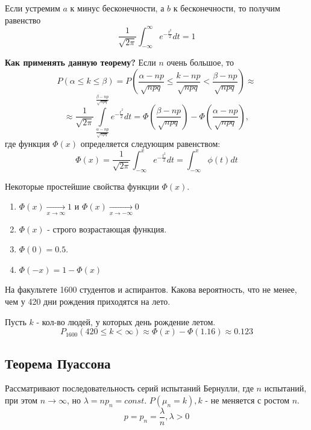 \begin{corollary}
	Если устремим $a$ к минус бесконечности, а $b$ к бесконечности, то получим равенство
	\[ \frac{1}{\sqrt{2 \pi}} \int_{-\infty}^{\infty} e^{-\frac{t^2}{2}} dt = 1 \]
\end{corollary}

\noindent \textbf{Как применять данную теорему?} Если $n$ очень большое, то
\[ P(\alpha \le k \le \beta) = P \left( \frac{\alpha - np}{\sqrt{npq}} \le \frac{k - np}{\sqrt{npq}} < \frac{\beta - np}{\sqrt{npq}} \right) \approx \]
\[ \approx \frac{1}{\sqrt{2 \pi}} \int\limits_{\frac{\alpha - np}{\sqrt{npq}}}^{\frac{\beta - np}{\sqrt{npq}}} e^{-\frac{t^2}{2}} dt = \Phi \left( \frac{\beta - np}{\sqrt{npq}} \right) - \Phi \left( \frac{\alpha - np}{\sqrt{npq}} \right), \]
где функция $\Phi (x)$ определяется следующим равенством:
\[ \Phi (x) = \frac{1}{\sqrt{2 \pi}} \int_{-\infty}^{x} e^{-\frac{t^2}{2}} dt = \int_{-\infty}^{x} \phi (t) dt \]

Некоторые простейшие свойства функции $\Phi (x)$.
\begin{enumerate}
	\item $\Phi (x) \underset{x \to \infty}{\to} 1$ и $\Phi (x) \underset{x \to - \infty}{\to} 0$
	\item $\Phi (x)$ - строго возрастающая функция.
	\item $\Phi (0) = 0.5$.
	\item $\Phi (-x) = 1 - \Phi (x)$
\end{enumerate}

\begin{exmp}
	На факультете 1600 студентов и аспирантов. Какова вероятность, что не менее, чем у 420 дни рождения приходятся на лето.
	
	Пусть $k$ - кол-во людей, у которых день рождение летом.
	\[ P_{1600} (420 \le k < \infty) \approx \Phi (x) - \Phi (1.16) \approx 0.123 \]
\end{exmp}

\subsection{Теорема Пуассона}

\begin{definition}
	Рассматривают последовательность серий испытаний Бернулли, где $n$ испытаний, при этом $n \to \infty$, но $\lambda = n p_n = const$. $P(\mu_n = k), k$ - не меняется с ростом $n$.
	\[ p = p_n = \dfrac{\lambda}{n}, \lambda > 0 \]
\end{definition}

